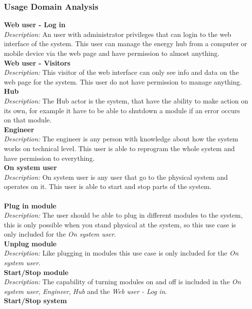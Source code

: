 	\subsubsection{Usage Domain Analysis}
		\textbf{Web user - Log in}
		\\\textit{Description: }
		An user with administrator privileges that can login to the web interface of the system. This user can manage the energy hub from a computer or mobile device
		 via the web page and have permission to almost anything.
		\\\textbf{Web user - Visitors}
		\\\textit{Description: }
		This visitor of the web interface can only see info and data on the web page for the system. This user do not have permission to manage anything.
		\\\textbf{Hub}
		\\\textit{Description: }
		The Hub actor is the system, that have the ability to make action on its own, for example it have to be able to shutdown a module if an error occurs on that module.
		\\\textbf{Engineer}
		\\\textit{Description: }
		The engineer is any person with knowledge about how the system works on technical level. This user is able to reprogram the whole system and have permission to everything.
		\\\textbf{On system user}
		\\\textit{Description: }
		On system user is any user that go to the physical system and operates on it. This user is able to start and stop parts of the system.
		\\\\\textbf{Plug in module}
		\\\textit{Description: }
		The user should be able to plug in different modules to the system, this is only possible when you stand physical at the system, so this use case is only included for the \textit{On system user}.
		\\\textbf{Unplug module}
		\\\textit{Description: }
		Like plugging in modules this use case is only included for the \textit{On system user}.
		\\\textbf{Start/Stop module}
		\\\textit{Description: }
		The capability of turning modules on and off is included in the \textit{On system user}, \textit{Engineer}, \textit{Hub} and the \textit{Web user - Log in}.
		\\\textbf{Start/Stop system}
